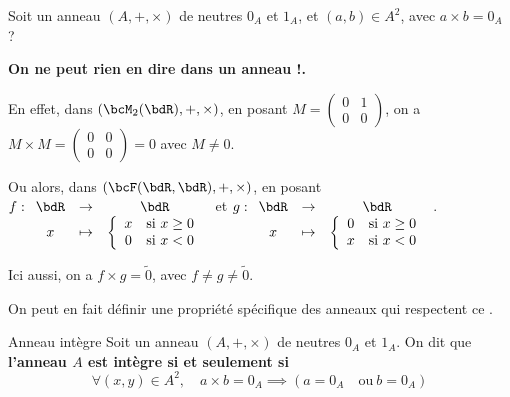 \documentclass[a4paper,french,bookmarks]{article}
\begin{document}
\begin{warning}{}{}
    Soit un anneau $(A, +, \times)$ de neutres $0_A$ et $1_A$, et $(a, b) \in A^2$, avec $a\times b = 0_A$ ?
    
    \begin{center}
        \bf{On ne peut rien en dire dans un anneau !}.
    \end{center}
    
    En effet, dans $(\bcM_2(\bdR), +, \times)$, en posant $M = \left(\begin{array}{cc}
        0 & 1 \\
        0 & 0
    \end{array}\right)$, on a $M \times M = \left(\begin{array}{cc}
        0 & 0 \\
        0 & 0
    \end{array}\right) = 0$ avec $M \neq 0$.
    
    Ou alors, dans $(\bcF(\bdR, \bdR), +, \times)$, en posant $f : \begin{array}[t]{ccc}
        \bdR &\to& \bdR \\
        x &\mapsto& \left\lbrace\begin{array}{cl}
            x &\text{si} \ x \geq 0  \\
            0 &\text{si} \ x < 0 
        \end{array}\right. 
    \end{array}$ et $g : \begin{array}[t]{ccc}
        \bdR &\to& \bdR \\
        x &\mapsto& \left\lbrace\begin{array}{cl}
            0 &\text{si} \ x \geq 0  \\
            x &\text{si} \ x < 0 
        \end{array}\right. 
    \end{array}$.
    
    Ici aussi, on a $f \times g = \widetilde 0$, avec $f \neq g \neq \widetilde 0$.
\end{warning}

On peut en fait définir une propriété spécifique des anneaux qui respectent ce .

\begin{definition}{Anneau intègre}{}
    Soit un anneau $(A, +, \times)$ de neutres $0_A$ et $1_A$. On dit que \bf{l'anneau $A$ est intègre} si et seulement si
    \[ \forall (x, y) \in A^2,\quad a\times b = 0_A \implies (a = 0_A \quad \text{ou} \  b = 0_A)\]
\end{definition}
\end{document}
